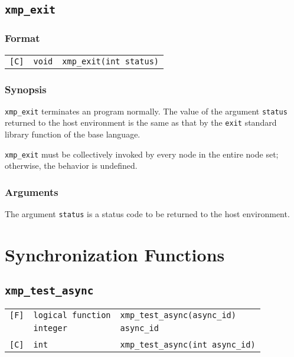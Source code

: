 \subsection{{\tt xmp\_exit}}
\label{subsec: xmp_exit}

\subsubsection*{Format}

\begin{tabular}{lll}

\verb![C]!&  {\tt void}& {\tt xmp\_exit(int status)}\\

\end{tabular}

\subsubsection*{Synopsis}

{\tt xmp\_exit} terminates an {\XMP} program normally.
The value of the argument {\tt status} returned to the host
environment is the same as that by the {\tt exit} standard library
function of the base language.

{\tt xmp\_exit} must be collectively invoked by every node in the
entire node set; otherwise, the behavior is undefined.

\subsubsection*{Arguments}

The argument {\tt status} is a status code to be returned to the host
environment.


\section{Synchronization Functions}

\subsection{\tt xmp\_test\_async}

\begin{tabular}{lll}

\verb![F]!& {\tt logical function} & {\tt xmp\_test\_async(async\_id)}\\
          & {\tt integer} & {\tt async\_id}\\
          & & \\
\verb![C]!&  {\tt int} & {\tt  xmp\_test\_async(int async\_id)}

\end{tabular}

